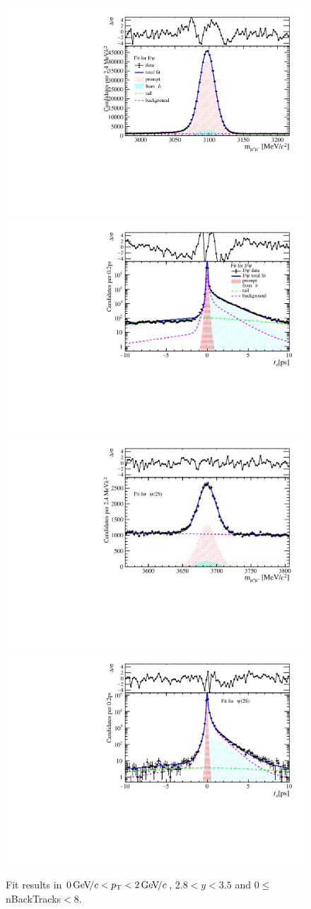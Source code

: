 \begin{figure}[H]
\begin{center}
\includegraphics[width=0.47\linewidth]{pdf/Jpsi/drawmassB/n1y2pt1.pdf}
\includegraphics[width=0.47\linewidth]{pdf/Jpsi/2DFitB/n1y2pt1.pdf}
\vspace*{-0.5cm}
\includegraphics[width=0.47\linewidth]{pdf/Psi2S/drawmassB/n1y2pt1.pdf}
\includegraphics[width=0.47\linewidth]{pdf/Psi2S/2DFitB/n1y2pt1.pdf}
\vspace*{-0.5cm}
\end{center}
\caption{Fit results in $0\text{\,Ge\kern -0.1em V\!/}c<p_{\mathrm{T}}<2\text{\,Ge\kern -0.1em V\!/}c$, $2.8<y<3.5$ and 0$\leq$nBackTracks$<$8.}
\label{Fitn1y2pt1}
\end{figure}
